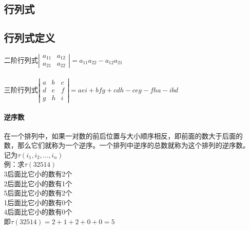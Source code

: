 \documentclass{article}
\begin{document}
\begin{flushleft}
	\LARGE

	\section{行列式}

	\subsection{行列式定义}
	二阶行列式$\left|\begin{array}{cccc} 
	a_{11}&a_{12}\\ 
	a_{21}&a_{22}
	\end{array}\right|=a_{11}a_{22}-a_{12}a_{21}$\\
	~\\
	三阶行列式$\left|\begin{array}{cccc} 
	a&b&c\\ 
	d&e&f\\
	g&h&i
	\end{array}\right|=aei+bfg+cdh-ceg-fha-ibd$\\

	\paragraph{逆序数}
	在一个排列中，如果一对数的前后位置与大小顺序相反，即前面的数大于后面的数，那么它们就称为一个逆序。一个排列中逆序的总数就称为这个排列的逆序数。记为$\tau(i_1,i_2,...,i_n)$\\
	例：求$\tau(32514)$\\
	\qquad 3后面比它小的数有2个\\
	\qquad 2后面比它小的数有1个\\
	\qquad 5后面比它小的数有2个\\
	\qquad 1后面比它小的数有0个\\
	\qquad 4后面比它小的数有0个\\
	\qquad 即$\tau(32514)=2+1+2+0+0=5$\\
	

\end{flushleft}
\end{document}

